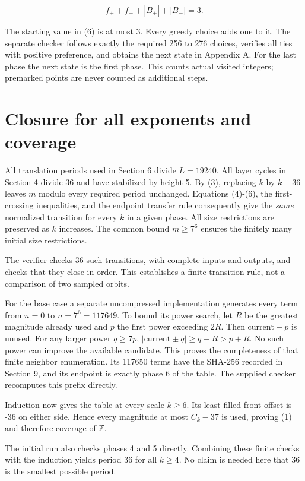 \documentclass[11pt,a4paper]{article}
\begin{document}
\begin{equation*}
f_++f_-+|B_+|+|B_-|=3. \tag{6}\label{eq:count}
\end{equation*}

The starting value in (6) is at most 3. Every greedy choice adds one to it. The separate checker follows exactly the required 256 to 276 choices, verifies all ties with positive preference, and obtains the next state in Appendix A. For the last phase the next state is the first phase. This counts actual visited integers; premarked points are never counted as additional steps.

\section{Closure for all exponents and coverage}
\label{sec:7}

All translation periods used in Section 6 divide $L=19240$. All layer cycles in Section 4 divide 36 and have stabilized by height 5. By (3), replacing $k$ by $k+36$ leaves $m$ modulo every required period unchanged. Equations (4)-(6), the first-crossing inequalities, and the endpoint transfer rule consequently give the \emph{same} normalized transition for every $k$ in a given phase. All size restrictions are preserved as $k$ increases. The common bound $m\ge7^6$ ensures the finitely many initial size restrictions.

The verifier checks 36 such transitions, with complete inputs and outputs, and checks that they close in order. This establishes a finite transition rule, not a comparison of two sampled orbits.

For the base case a separate uncompressed implementation generates every term from $n=0$ to $n=7^6=117649$. To bound its power search, let $R$ be the greatest magnitude already used and $p$ the first power exceeding $2R$. Then $\mathrm{current}+p$ is unused. For any larger power $q\ge7p$, $|\mathrm{current}\pm q|\ge q-R>p+R$. No such power can improve the available candidate. This proves the completeness of that finite neighbor enumeration. Its 117650 terms have the SHA-256 recorded in Section 9, and its endpoint is exactly phase 6 of the table. The supplied checker recomputes this prefix directly.

Induction now gives the table at every scale $k\ge6$. Its least filled-front offset is -36 on either side. Hence every magnitude at most $C_k-37$ is used, proving (1) and therefore coverage of $\mathbb Z$.

The initial run also checks phases 4 and 5 directly. Combining these finite checks with the induction yields period 36 for all $k\ge4$. No claim is needed here that 36 is the smallest possible period.
\end{document}
